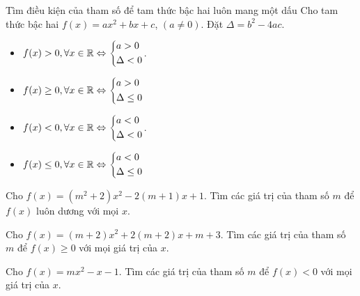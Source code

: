 \setcounter{vd}{0}
\begin{dang}{Tìm điều kiện của tham số để tam thức bậc hai luôn mang một dấu}
	Cho tam thức bậc hai $f(x)=ax^2+bx+c$, $(a\ne 0)$. Đặt $\Delta =b^2-4ac$.
	\begin{itemize}
		\item $f(x)> 0, \forall x\in \mathbb{R} \Leftrightarrow \left\{\begin{aligned}&a>0\\ &\Delta < 0\end{aligned}\right.$.
		\item $f(x)\ge 0, \forall x\in \mathbb{R}\Leftrightarrow \left\{\begin{aligned}&a>0\\& \Delta \le 0\end{aligned}\right.$
		\item $f(x)< 0, \forall x\in \mathbb{R} \Leftrightarrow \left\{\begin{aligned}&a<0\\ &\Delta < 0\end{aligned}\right.$.
		\item $f(x)\le 0, \forall x\in \mathbb{R}\Leftrightarrow \left\{\begin{aligned}&a<0\\& \Delta \le 0\end{aligned}\right.$
	\end{itemize}
	
\end{dang}

\begin{vd}%
	Cho $f(x)=(m^2+2)x^2-2(m+1)x+1$. Tìm các giá trị của tham số $m$ để $f(x)$ luôn dương với mọi $x$.
\end{vd}

\begin{vd}%
	Cho $f(x)=(m+2)x^2+2(m+2)x+m+3$. Tìm các giá trị của tham số $m$ để $f(x)\ge 0$ với mọi giá trị của $x$.
\end{vd}


\begin{vd}%
	Cho $f(x)=mx^2-x-1$. Tìm các giá trị của tham số $m$ để $f(x)<0$ với mọi giá trị của $x$.
\end{vd}

